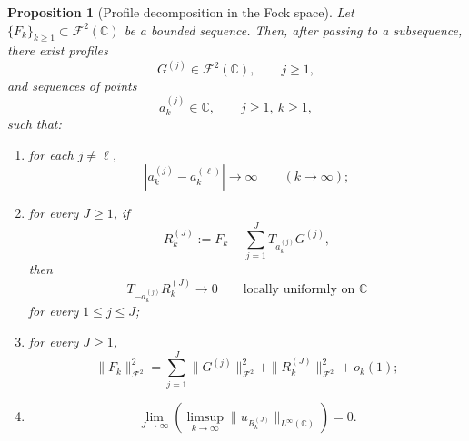 \documentclass[a4paper,11pt,reqno]{amsart}
\numberwithin{equation}{section}
\theoremstyle{plain} %
\newtheorem{proposition}{Proposition}[section]
\theoremstyle{definition} %
\theoremstyle{remark}
\newcommand{\C}{\mathbb{C}}
\begin{document}
\begin{proposition}[Profile decomposition in the Fock space]\label{prop:profile-global}
Let \(\{F_k\}_{k\ge 1}\subset \mathcal F^2(\C)\) be a bounded sequence. Then,
after passing to a subsequence, there exist profiles
\[
G^{(j)}\in \mathcal F^2(\C),
\qquad j\ge 1,
\]
and sequences of points
\[
a_k^{(j)}\in \C,
\qquad j\ge 1,\ k\ge 1,
\]
such that:
\begin{enumerate}
    \item[(i)] for each \(j\neq \ell\),
    \[
    |a_k^{(j)}-a_k^{(\ell)}|\to \infty
    \qquad (k\to \infty);
    \]
    \item[(ii)] for every \(J\ge 1\), if
    \[
    R_k^{(J)}
    :=
    F_k-\sum_{j=1}^J T_{a_k^{(j)}}G^{(j)},
    \]
    then
    \[
    T_{-a_k^{(j)}}R_k^{(J)}\to 0
    \qquad\text{locally uniformly on }\C
    \]
    for every \(1\le j\le J\);
    \item[(iii)] for every \(J\ge 1\),
    \[
    \|F_k\|_{\mathcal F^2}^2
    =
    \sum_{j=1}^J \|G^{(j)}\|_{\mathcal F^2}^2
    +\|R_k^{(J)}\|_{\mathcal F^2}^2
    +o_k(1);
    \]
    \item[(iv)]
    \[
    \lim_{J\to\infty}\left(\limsup_{k\to\infty}
    \|u_{R_k^{(J)}}\|_{L^\infty(\C)}\right)=0.
    \]
\end{enumerate}
\end{proposition}
\end{document}
